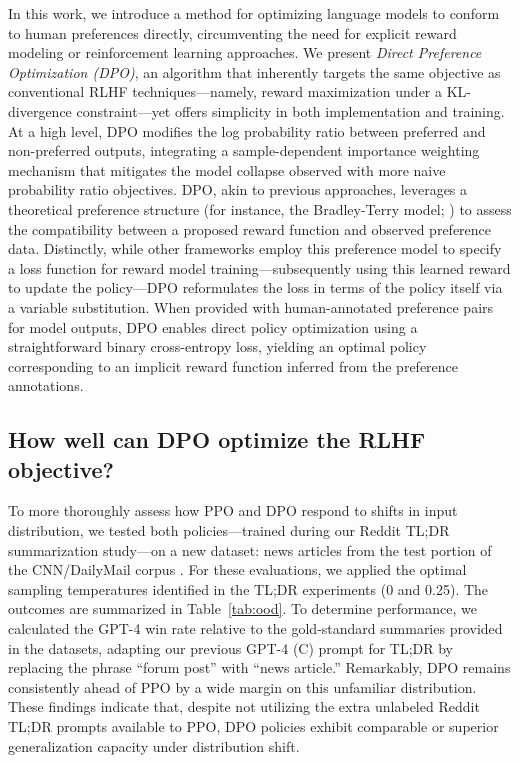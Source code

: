 In this work, we introduce a method for optimizing language models to conform to human preferences directly, circumventing the need for explicit reward modeling or reinforcement learning approaches. We present \textit{{Direct Preference Optimization} (DPO)}, an algorithm that inherently targets the same objective as conventional RLHF techniques—namely, reward maximization under a KL-divergence constraint—yet offers simplicity in both implementation and training. At a high level, DPO modifies the log probability ratio between preferred and non-preferred outputs, integrating a sample-dependent importance weighting mechanism that mitigates the model collapse observed with more naive probability ratio objectives. DPO, akin to previous approaches, leverages a theoretical preference structure (for instance, the Bradley-Terry model; \cite{bradley1952rankanalysis}) to assess the compatibility between a proposed reward function and observed preference data. Distinctly, while other frameworks employ this preference model to specify a loss function for reward model training—subsequently using this learned reward to update the policy—DPO reformulates the loss in terms of the policy itself via a variable substitution. When provided with human-annotated preference pairs for model outputs, DPO enables direct policy optimization using a straightforward binary cross-entropy loss, yielding an optimal policy corresponding to an implicit reward function inferred from the preference annotations.

\subsection{How well can DPO optimize the RLHF objective?}

To more thoroughly assess how PPO and DPO respond to shifts in input distribution, we tested both policies—trained during our Reddit TL;DR summarization study—on a new dataset: news articles from the test portion of the CNN/DailyMail corpus \citep{nallapati-etal-2016-abstractive}. For these evaluations, we applied the optimal sampling temperatures identified in the TL;DR experiments (0 and 0.25). The outcomes are summarized in Table~\ref{tab:ood}. To determine performance, we calculated the GPT-4 win rate relative to the gold-standard summaries provided in the datasets, adapting our previous GPT-4 (C) prompt for TL;DR by replacing the phrase ``forum post'' with ``news article.'' Remarkably, DPO remains consistently ahead of PPO by a wide margin on this unfamiliar distribution. These findings indicate that, despite not utilizing the extra unlabeled Reddit TL;DR prompts available to PPO, DPO policies exhibit comparable or superior generalization capacity under distribution shift.

